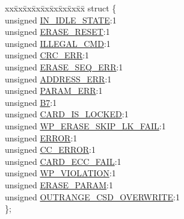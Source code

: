 \begin{DoxyCompactItemize}
\begin{tabbing}
\end{tabbing}\item 
\begin{tabbing}
xx\=xx\=xx\=xx\=xx\=xx\=xx\=xx\=xx\=\kill
struct \{\\
\>unsigned \hyperlink{union_r_e_s_p_o_n_s_e__2_aacd57ecac9535b8bbec237cd7b8f1d5b}{IN\_IDLE\_STATE}:1\\
\>unsigned \hyperlink{union_r_e_s_p_o_n_s_e__2_a732e20ed50aafc3cc46fea840b0db62a}{ERASE\_RESET}:1\\
\>unsigned \hyperlink{union_r_e_s_p_o_n_s_e__2_ad0ff111a5b1536c0a0929f4d4abe187f}{ILLEGAL\_CMD}:1\\
\>unsigned \hyperlink{union_r_e_s_p_o_n_s_e__2_a5398e0947b8fd503827274978d3b6944}{CRC\_ERR}:1\\
\>unsigned \hyperlink{union_r_e_s_p_o_n_s_e__2_a9b3e70b8700e18c59f4ef0a7aa636b9a}{ERASE\_SEQ\_ERR}:1\\
\>unsigned \hyperlink{union_r_e_s_p_o_n_s_e__2_a245b3cd89542e3152c04b924b8aa2446}{ADDRESS\_ERR}:1\\
\>unsigned \hyperlink{union_r_e_s_p_o_n_s_e__2_a22dcbf2add4c812de207ef9a507758e3}{PARAM\_ERR}:1\\
\>unsigned \hyperlink{union_r_e_s_p_o_n_s_e__2_afc348e9a96bdf6c375205eb63ce6ab06}{B7}:1\\
\>unsigned \hyperlink{union_r_e_s_p_o_n_s_e__2_a6abfb0fbad28efb0a09f4e85fab1408f}{CARD\_IS\_LOCKED}:1\\
\>unsigned \hyperlink{union_r_e_s_p_o_n_s_e__2_a74e0c7173ad93dc39688404120822ced}{WP\_ERASE\_SKIP\_LK\_FAIL}:1\\
\>unsigned \hyperlink{union_r_e_s_p_o_n_s_e__2_ad2d286c7ff65560af03ee3e7c6961651}{ERROR}:1\\
\>unsigned \hyperlink{union_r_e_s_p_o_n_s_e__2_ace2f7434210c49f67da2a96b83ad9230}{CC\_ERROR}:1\\
\>unsigned \hyperlink{union_r_e_s_p_o_n_s_e__2_a62cb02fc9d8c6b7a956ed2b113ee37c3}{CARD\_ECC\_FAIL}:1\\
\>unsigned \hyperlink{union_r_e_s_p_o_n_s_e__2_a7174fd520c10b13ee86cdf7f63aae3cb}{WP\_VIOLATION}:1\\
\>unsigned \hyperlink{union_r_e_s_p_o_n_s_e__2_a75bc8929f6da99a71038ae63303be8bd}{ERASE\_PARAM}:1\\
\>unsigned \hyperlink{union_r_e_s_p_o_n_s_e__2_a89e7d4eb33fd94c78a9948b98ba1739c}{OUTRANGE\_CSD\_OVERWRITE}:1\\
\}; \\

\end{tabbing}\end{DoxyCompactItemize}


